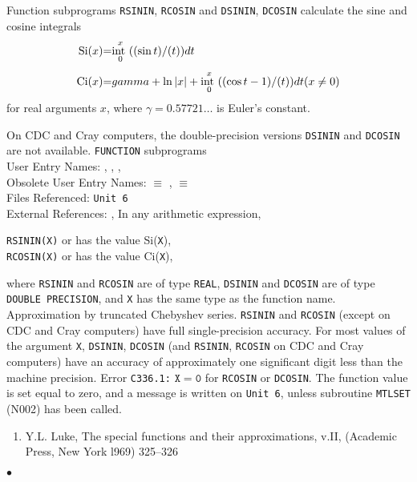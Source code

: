                            
                      
\Submitter{}                                
                     
Function subprograms {\tt RSININ}, {\tt RCOSIN} and
{\tt DSININ}, {\tt DCOSIN} calculate the sine and cosine integrals
$$ \begin{array}{r@{\quad = \quad}l}
\mbox{\rm Si}(x) & \displaystyle \int^x_0\frac{\sin t}{t}dt \\[4mm]
\mbox{\rm Ci}(x) & \displaystyle
\gamma+\ln|x|+\int^x_0 \frac{\cos t - 1}{t}dt \qquad
(x\ne 0)
\end{array} $$
for real arguments $x$,
where $\gamma = 0.57721 \ldots$ is Euler's constant.
\par
On CDC and Cray computers, the double-precision versions
{\tt DSININ} and {\tt DCOSIN} are not available.
\Structure
{\tt FUNCTION} subprograms \\
 User Entry Names: , , ,
 \\
Obsolete User Entry Names:  $\equiv$ ,
                            $\equiv$  \\
Files Referenced: {\tt Unit 6} \\
External References: , 
\Usage
In any arithmetic expression,
\begin{center}
{\tt RSININ(X)} \quad or  \quad has the value \quad
Si({\tt X}), \\
{\tt RCOSIN(X)} \quad or  \quad has the value \quad
Ci({\tt X}),
\end{center}
where {\tt RSININ} and {\tt RCOSIN} are of type {\tt REAL}, {\tt DSININ}
and {\tt DCOSIN} are of type {\tt DOUBLE PRECISION},
and {\tt X} has the same type as the function name.
\Method
Approximation by truncated Chebyshev series.
\Accuracy
{\tt RSININ} and {\tt RCOSIN} (except on CDC and Cray computers)
have full single-precision accuracy.
For most values of the argument {\tt X}, {\tt DSININ}, {\tt DCOSIN}
(and {\tt RSININ}, {\tt RCOSIN} on CDC and Cray computers) have an
accuracy of
approximately one significant digit less than the machine precision.
\Errorh
Error {\tt C336.1:}  $\mathtt{X = 0}$ for {\tt RCOSIN} or {\tt DCOSIN}.
The function value is set equal to zero, and a message is written on
{\tt Unit 6}, unless subroutine {\tt MTLSET} (N002) has been called.
\Refer
\begin{enumerate}
\item Y.L. Luke, The special functions and their approximations, v.II,
(Academic Press, New York l969) 325--326
\end{enumerate}
$\bullet$
